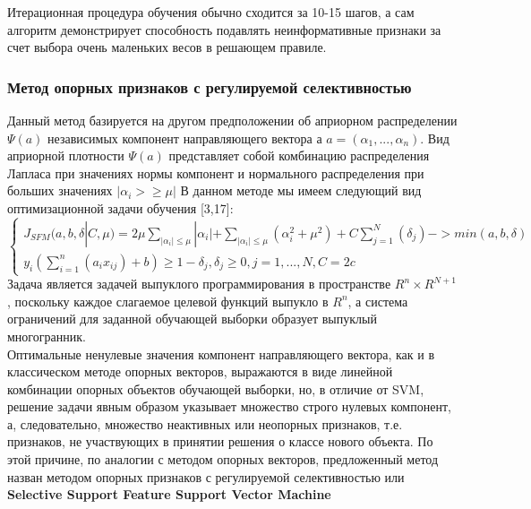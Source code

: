 \documentclass[../body.tex]{subfiles}
\begin{document}
Итерационная процедура обучения обычно сходится за 10-15 шагов, а сам алгоритм
демонстрирует способность подавлять неинформативные признаки за счет выбора очень
маленьких весов в решающем правиле.
\\

\subsubsection{Метод опорных признаков с регулируемой селективностью}
Данный метод базируется на другом
предположении об априорном распределении $\varPsi(a)$ независимых компонент направляющего вектора а $a=(\alpha_1, ..., \alpha_n)$. Вид априорной плотности $\varPsi(a)$ представляет собой комбинацию распределения Лапласа при значениях нормы компонент и нормального распределения при больших значениях $|\alpha_{i}>\geq\mu|$ 
В данном методе мы имеем следующий вид оптимизационной задачи обучения [3,17]:
$$\left\{\begin{matrix}
	J_{SFM}(a, b, \delta |C,\mu) = 2\mu\sum_{|\alpha_{i}|\leq\mu}|\alpha_{i}| + \sum_{|\alpha_{i}|\leq\mu}(\alpha_{i}^2 + \mu^2)+ C\sum_{j=1}^{N}(\delta_j)->min(a,b,\delta)
	\\
	y_i(\sum_{i=1}^{n}(a_ix_{ij})+b)\geq1-\delta_j, \delta_j \geq 0, j= 1,...,N, C=2c
\end{matrix}\right.$$
Задача является задачей выпуклого программирования в пространстве $R^n \times R^{N+1}$, поскольку каждое слагаемое целевой функций выпукло в $R^n$, а система ограничений для заданной обучающей выборки образует выпуклый многогранник.
\\

Оптимальные ненулевые значения компонент направляющего вектора, как и в классическом методе опорных векторов, выражаются в виде линейной комбинации опорных объектов обучающей выборки, но, в отличие от SVM, решение задачи явным образом указывает множество строго нулевых компонент, а, следовательно, множество неактивных или неопорных признаков, т.е. признаков, не участвующих
в принятии решения о классе нового объекта. По этой причине, по аналогии с методом
опорных векторов, предложенный метод назван  методом опорных признаков
с регулируемой селективностью или \textbf{Selective Support Feature Support Vector Machine}
\end{document}
